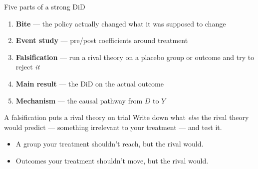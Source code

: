 \documentclass[aspectratio=169,11pt]{beamer}
\begin{document}
\begin{frame}{Five parts of a strong DiD}
\vspace{0.6em}
\begin{enumerate}
  \item \textbf{\color{accent}Bite} --- the policy actually changed what it was supposed to change
  \item \textbf{\color{accent}Event study} --- pre/post coefficients around treatment
  \item \textbf{\color{accent}Falsification} --- run a rival theory on a placebo group or outcome and try to reject \textit{it}
  \item \textbf{\color{accent}Main result} --- the DiD on the actual outcome
  \item \textbf{\color{accent}Mechanism} --- the causal pathway from $D$ to $Y$
\end{enumerate}
\vspace{0.5em}
\end{frame}

\begin{frame}{A falsification puts a rival theory on trial}
\vspace{0.5em}
Write down what \textit{else} the rival theory would predict --- something irrelevant to your treatment --- and test it.
\vspace{0.6em}
\begin{itemize}
  \item {} A group your treatment shouldn't reach, but the rival would. \\
  \item {} Outcomes your treatment shouldn't move, but the rival would. \\
\end{itemize}
\vspace{0.5em}
\end{frame}
\end{document}
